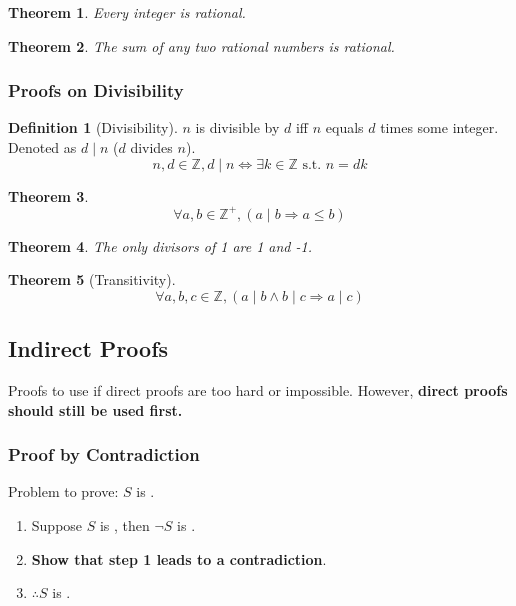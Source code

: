 \documentclass{article}
\theoremstyle{plain}
\newtheorem{theorem}{Theorem}[section]
\theoremstyle{definition}
\newtheorem*{definition}{Definition}
\theoremstyle{remark}
\begin{document}
\begin{theorem}
    Every integer is rational.
\end{theorem}

\begin{theorem}
    The sum of any two rational numbers is rational.
\end{theorem}

\subsubsection{Proofs on Divisibility}
\begin{definition}[Divisibility]
$n$ is divisible by $d$ iff $n$ equals $d$ times some integer.
Denoted as $d \mid n$ ($d$ divides $n$).
    \[ n,d \in \mathbb{Z}, d \mid n \Leftrightarrow \exists k \in \mathbb{Z} \text{ s.t. } n = dk \]
\end{definition}

\begin{theorem}
    \[ \forall a, b \in \mathbb{Z}^+, (a \mid b \Rightarrow a \leq b) \]
\end{theorem}

\begin{theorem}
    The only divisors of 1 are 1 and -1.
\end{theorem}

\begin{theorem}[Transitivity]
    \[ \forall a,b,c \in \mathbb{Z}, (a \mid b \wedge b \mid c \Rightarrow a \mid c) \]
\end{theorem}

\subsection{Indirect Proofs}
Proofs to use if direct proofs are too hard or impossible. However, \textbf{direct proofs should still be used first.}

\subsubsection{Proof by Contradiction}
Problem to prove: $S$ is \textcolor{blue}{}.
\begin{enumerate}
    \item Suppose $S$ is \textcolor{red}{}, then $\neg S$ is \textcolor{blue}{}.
    \item \textbf{Show that step 1 leads to a contradiction}.
    \item $\therefore S$ is \textcolor{blue}{}.
\end{enumerate}
\end{document}
